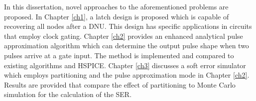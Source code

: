 In this dissertation, novel approaches to the aforementioned problems are proposed. In Chapter \ref{ch1}, a latch design is proposed which is capable of recovering all nodes after a DNU. This design has specific applications in circuits that employ clock gating. Chapter \ref{ch2} provides an enhanced analytical pulse approximation algorithm which can determine the output pulse shape when two pulses arrive at a gate input. The method is implemented and compared to existing algorithms and HSPICE. Chapter \ref{ch3} discusses a soft error simulator which employs partitioning and the pulse approximation mode in Chapter \ref{ch2}. Results are provided that compare the effect of partitioning to Monte Carlo simulation for the calculation of the SER.